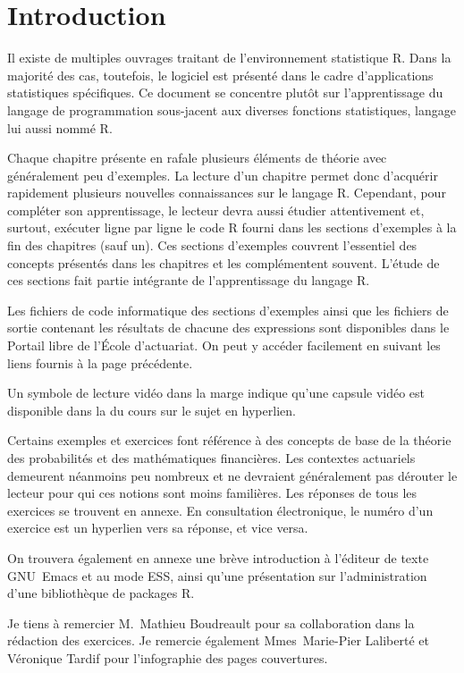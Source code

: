 \chapter*{Introduction}

Il existe de multiples ouvrages traitant de l'environnement
statistique R. Dans la majorité des cas, toutefois, le logiciel est
présenté dans le cadre d'applications statistiques spécifiques. Ce
document se concentre plutôt sur l'apprentissage du langage de
programmation sous-jacent aux diverses fonctions statistiques, langage
lui aussi nommé R.

Chaque chapitre présente en rafale plusieurs éléments de théorie avec
généralement peu d'exemples. La lecture d'un chapitre permet donc
d'acquérir rapidement plusieurs nouvelles connaissances sur le langage
R. Cependant, pour compléter son apprentissage, le lecteur devra aussi
étudier attentivement et, surtout, exécuter ligne par ligne le code R
fourni dans les sections d'exemples à la fin des chapitres (sauf un).
Ces sections d'exemples couvrent l'essentiel des concepts présentés
dans les chapitres et les complémentent souvent. L'étude de ces
sections fait partie intégrante de l'apprentissage du langage R.

Les fichiers de code informatique des sections d'exemples ainsi que
les fichiers de sortie contenant les résultats de chacune des
expressions sont disponibles dans le Portail libre de l'École
d'actuariat. On peut y accéder facilement en suivant les liens fournis
à la page précédente.

Un symbole de lecture vidéo dans la marge indique qu'une capsule vidéo
est disponible dans la %
du cours sur le sujet en hyperlien.

Certains exemples et exercices font référence à des concepts de base
de la théorie des probabilités et des mathématiques financières. Les
contextes actuariels demeurent néanmoins peu nombreux et ne devraient
généralement pas dérouter le lecteur pour qui ces notions sont moins
familières. Les réponses de tous les exercices se trouvent en annexe.
En consultation électronique, le numéro d'un exercice est un hyperlien
vers sa réponse, et vice versa.

On trouvera également en annexe une brève introduction à l'éditeur de
texte GNU~Emacs et au mode ESS, ainsi qu'une présentation sur
l'administration d'une bibliothèque de packages R.

Je tiens à remercier M.~Mathieu Boudreault pour sa collaboration dans
la rédaction des exercices. Je remercie également Mmes~Marie-Pier
Laliberté et Véronique Tardif pour l'infographie des pages
couvertures.

